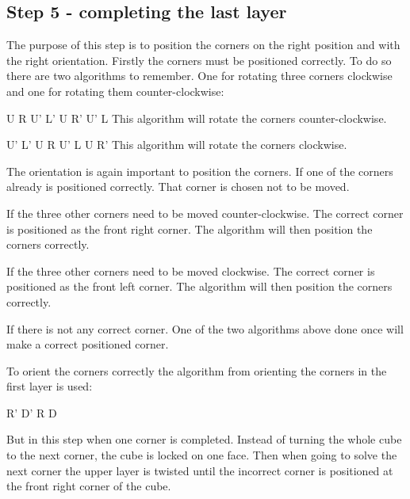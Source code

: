 \subsection{Step 5 - completing the last layer}
The purpose of this step is to position the corners on the right position and with the right orientation. Firstly the corners must be positioned correctly. To do so there are two algorithms to remember. One for rotating three corners clockwise and one for rotating them counter-clockwise:

U R U' L' U R' U' L
This algorithm will rotate the corners counter-clockwise.

U' L' U R U' L U R'
This algorithm will rotate the corners clockwise.

The orientation is again important to position the corners. If one of the corners already is positioned correctly. That corner is chosen not to be moved. 

If the three other corners need to be moved counter-clockwise. The correct corner is positioned as the front right corner. The algorithm will then position the corners correctly.

If the three other corners need to be moved clockwise. The correct corner is positioned as the front left corner. The algorithm will then position the corners correctly.

If there is not any correct corner. One of the two algorithms above done once will make a correct positioned corner.

To orient the corners correctly the algorithm from orienting the corners in the first layer is used:

R' D' R D

But in this step when one corner is completed. Instead of turning the whole cube to the next corner, the cube is locked on one face. Then when going to solve the next corner the upper layer is twisted until the incorrect corner is positioned at the front right corner of the cube.